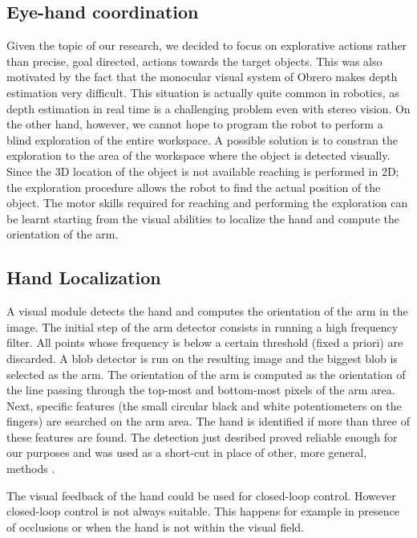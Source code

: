 \subsection{Eye-hand coordination}
Given the topic of our research, we decided to focus on explorative 
actions rather than precise, goal directed, actions towards the target objects.
This was also motivated by the fact that the monocular visual system of Obrero
makes depth estimation very difficult. This situation is actually quite common 
in robotics, as depth estimation in real time is a challenging problem even with 
stereo vision.
On the other hand, however, we cannot hope to program the robot to perform 
a blind exploration of the entire workspace. A possible solution is to 
constran the exploration to the area of the workspace where the object is 
detected visually. Since the 3D location of the object is not available reaching 
is performed in 2D; the exploration procedure allows the robot to find the actual
position of the object. The motor skills required for reaching and performing 
the exploration can be learnt starting from the visual abilities 
to localize the hand and compute the orientation of the arm.

\subsection{Hand Localization}
A visual module detects the hand and computes the orientation of 
the arm in the image. The initial step of the arm detector consists
in running a high frequency filter. All points whose frequency 
is below a certain threshold (fixed a priori) are discarded. 
A blob detector is run on the resulting image and the biggest blob
is selected as the arm. The orientation of the arm is computed as the 
orientation of the line passing through the top-most and bottom-most 
pixels of the arm area.
Next, specific features (the small circular black and white 
potentiometers on the fingers) are searched on the arm
area. The hand is identified if more than three of these features are
found.
The detection just desribed proved reliable enough for our purposes 
and was used as a short-cut in place of other, more general, 
methods \cite{metta03early,natale05from}.

The visual feedback of the hand could be used for closed-loop control. 
However closed-loop control is not always suitable. This happens for example 
in presence of occlusions or when the hand is not within the visual field. 

